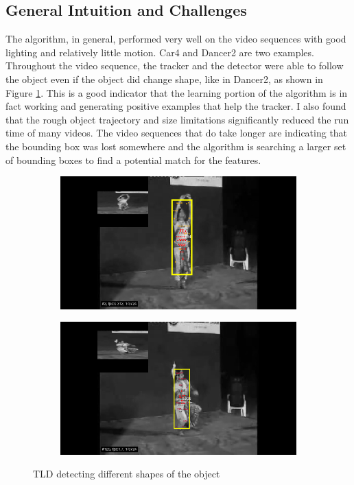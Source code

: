\documentclass[10pt,twocolumn,letterpaper]{article}
\begin{document}
\subsection{General Intuition and Challenges}
The algorithm, in general, performed very well on the video sequences with good lighting and relatively little motion. Car4 and Dancer2 are two examples. Throughout the video sequence, the tracker and the detector were able to follow the object even if the object did change shape, like in Dancer2, as shown in Figure \ref{fig:dancer}. This is a good indicator that the learning portion of the algorithm is in fact working and generating positive examples that help the tracker.  I also found that the rough object trajectory and size limitations significantly reduced the run time of many videos. The video sequences that do take longer are indicating that the bounding box was lost somewhere and the algorithm is searching a larger set of bounding boxes to find a potential match for the features.  \\
\begin{figure}
\begin{centering}
\begin{subfigure}[b]{0.4\textwidth}
\includegraphics[width=\textwidth]{dancer1}
\end{subfigure}
\begin{subfigure}[b]{0.4\textwidth}
\includegraphics[width=\textwidth]{dancer3}
\end{subfigure}

\caption{TLD detecting different shapes of the object}
\label{fig:dancer}
\end{centering}
\end{figure}
\end{document}
